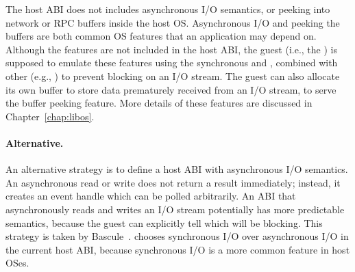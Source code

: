 The host ABI does not includes asynchronous I/O semantics, or peeking into network or RPC buffers inside the host OS.
Asynchronous I/O and peeking the buffers are both
common OS features that an application may depend on.
Although the features are not included in the host ABI,
the guest (i.e., the \libos{}) is supposed to emulate these features using the synchronous  and ,
combined with other \hostapis{} (e.g., )
to prevent blocking on an I/O stream.
The guest can also allocate its own buffer to store data prematurely received from an I/O stream,
to serve the buffer peeking feature.
More details of these features are discussed in Chapter~\ref{chap:libos}.



\paragraph{Alternative.}
An alternative strategy is to define a host ABI with asynchronous I/O semantics.
An asynchronous read or write
does not return a result immediately; instead, it creates an event handle
which can be polled arbitrarily.
An ABI that asynchronously reads and writes an I/O stream
potentially has more predictable semantics,
because the guest can explicitly tell which \hostapis{} will be blocking.
This strategy
is taken by Bascule~\cite{baumann13bascule}.
\graphene{} chooses synchronous I/O over asynchronous I/O in the current host ABI,
because synchronous I/O is a more common feature in host OSes.


 





